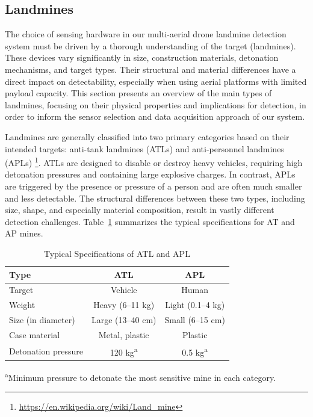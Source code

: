 \subsection{Landmines}

The choice of sensing hardware in our multi-aerial drone landmine detection system must be driven by a thorough understanding of the target (landmines). These devices vary significantly in size, construction materials, detonation mechanisms, and target types. Their structural and material differences have a direct impact on detectability, especially when using aerial platforms with limited payload capacity. This section presents an overview of the main types of landmines, focusing on their physical properties and implications for detection, in order to inform the sensor selection and data acquisition approach of our system.

Landmines are generally classified into two primary categories based on their intended targets: anti-tank landmines (ATLs) and anti-personnel landmines (APLs) \footnote{\url{https://en.wikipedia.org/wiki/Land_mine}}. ATLs are designed to disable or destroy heavy vehicles, requiring high detonation pressures and containing large explosive charges. In contrast, APLs are triggered by the presence or pressure of a person and are often much smaller and less detectable. The structural differences between these two types, including size, shape, and especially material composition, result in vastly different detection challenges. Table~\ref{tab:general_specs} summarizes the typical specifications for AT and AP mines.

\begin{table}[h]
    \centering
    \caption{Typical Specifications of ATL and APL \cite{paik2002image}}
    \label{tab:general_specs}
    \begin{tabular}{lcc}
        \toprule
        \textbf{Type} & \textbf{ATL} & \textbf{APL} \\
        \midrule
        Target & Vehicle & Human \\
        Weight & Heavy (6--11 kg) & Light (0.1--4 kg) \\
        Size (in diameter) & Large (13--40 cm) & Small (6--15 cm) \\
        Case material & Metal, plastic & Plastic \\
        Detonation pressure & 120 kg\textsuperscript{a} & 0.5 kg\textsuperscript{a} \\
        \bottomrule
    \end{tabular}
    \begin{flushleft}
        \vspace{1mm}
        \textsuperscript{a}Minimum pressure to detonate the most sensitive mine in each category.
    \end{flushleft}
\end{table}

